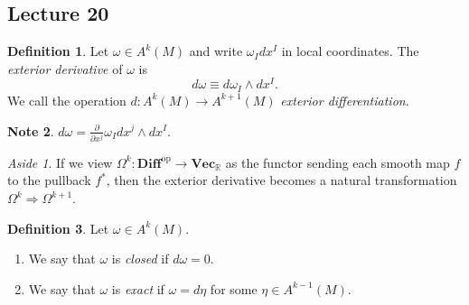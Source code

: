 \documentclass[10pt,letterpaper,cm]{nupset}
\theoremstyle{definition}
\newtheorem{definition}{Definition}[subsection]
\newtheorem{note}[definition]{Note}
\theoremstyle{theorem}
\theoremstyle{remark}
\newtheorem*{aside}{Aside}
\newcommand{\R}{\mathbb R}
\newcommand{\1}{\mathbf{1}}
\newcommand{\0}{\vec 0}
\begin{document}
\subsection{Lecture 20}

\begin{definition}
Let $\omega \in A^k(M)$ and write $\omega_I dx^I$ in local coordinates. The \textit{exterior derivative} of $\omega$ is $$d\omega \equiv d \omega_I \wedge dx^I.$$ We call the operation $d : A^k(M) \to A^{k+1}(M)$ \textit{exterior differentiation}.
\end{definition}

\begin{note}
$d \omega = \frac{\partial}{\partial{x^j}}\omega_I dx^j \wedge dx^I.$
\end{note}

\begin{aside}
If we view $\Omega^k : \textbf{Diff}^{\text{op}} \to \textbf{Vec}_{\R}$ as the functor sending each smooth map $f$ to the pullback $f^{\ast}$, then the exterior derivative becomes a natural transformation $\Omega^k \Rightarrow \Omega^{k+1}$.  
\end{aside}

\begin{definition} Let $\omega \in A^k(M)$.
\begin{enumerate}
\item We say that $\omega$ is \textit{closed} if $d \omega = 0$.
\item We say that $\omega$ is \textit{exact} if $\omega = d \eta$ for some $\eta \in A^{k-1}(M)$.
\end{enumerate}
\end{definition}
\end{document}
